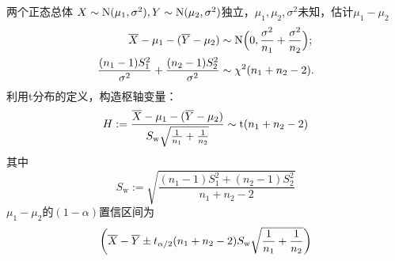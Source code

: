 \begin{example}{两个正态总体}{}
	$X \sim \operatorname{N}(\mu_1,\sigma^2),Y \sim \operatorname{N}(\mu_2,\sigma^2)$独立，$\mu_1,\mu_2,\sigma^2$未知，估计$\mu_1 - \mu_2$
	\begin{align*}
		\overline{X} - \mu_1 - (\overline{Y} - \mu_2) &\sim \operatorname{N}\Bigl(0,\frac{\sigma^2}{n_1} + \frac{\sigma^2}{n_2}\Bigr);\\
		\frac{(n_1 - 1)S_1^2}{\sigma^2} + \frac{(n_2 - 1)S_2^2}{\sigma^2} &\sim \chi^2(n_1 + n_2 - 2).
	\end{align*}
	利用t分布的定义，构造枢轴变量：
	\begin{equation}\label{eq:ps-pooled-t-pivot}
		H := \frac{\overline{X} - \mu_1 - (\overline{Y} - \mu_2)}{S_{\mathrm w}\sqrt{\frac1{n_1} + \frac1{n_2}}} \sim \operatorname{t}(n_1 + n_2 - 2)
	\end{equation}
	其中 
	\begin{equation}\label{eq:ps-pooled-variance}
		S_{\mathrm w} := \sqrt{\frac{(n_1 - 1)S_1^2 + (n_2 - 1)S_2^2}{n_1 + n_2 - 2}}
	\end{equation}
	$\mu_1 - \mu_2$的$(1 - \alpha)$置信区间为
	\begin{equation}\label{eq:ps-pooled-mean-difference-interval}
		\biggl(\overline{X} - \overline{Y} \pm t_{\alpha/2}(n_1 + n_2 - 2)S_{\mathrm w}\sqrt{\frac1{n_1} + \frac1{n_2}}\biggr)
	\end{equation}
\end{example}
